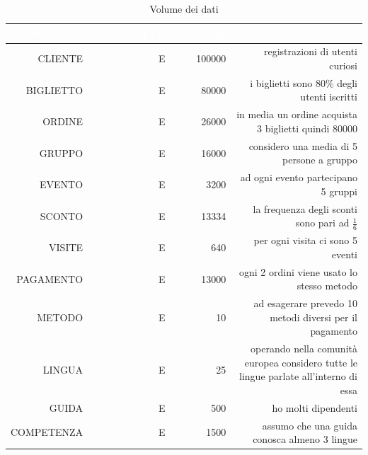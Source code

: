 \documentclass[a4paper,12pt]{report}
\begin{document}
\begin{xltabular}{\textwidth}{|D|D|D|D|}
	\caption{Volume dei dati} \label{tab:volumeDati}\\
	\hline
	 \textcolor{white}{\uppercase{concetto}} & \textcolor{white}{\uppercase{costrutto}} & \textcolor{white}{\uppercase{volume}} & \textcolor{white}{\uppercase{descrizione}} \\
	\hline
	\endhead
	\uppercase{cliente}                 & \uppercase{e}         & 100000             & registrazioni di utenti curiosi                                                       \\
	\hline
	\uppercase{biglietto}               & \uppercase{e}         & 80000              & i biglietti sono 80\% degli utenti iscritti                                           \\
	\hline
	\uppercase{ordine}                  & \uppercase{e}         & 26000              & in media un ordine acquista 3 biglietti quindi 80000                                  \\
	\hline
	\uppercase{gruppo}                  & \uppercase{e}         & 16000              & considero una media di 5 persone a gruppo                                             \\
	\hline
	\uppercase{evento}                  & \uppercase{e}         & 3200               & ad ogni evento partecipano 5 gruppi                                                   \\
	\hline
	\uppercase{sconto}                  & \uppercase{e}         & 13334              & la frequenza degli sconti sono pari ad \(\frac16\)                                    \\
	\hline
	\uppercase{visite}                  & \uppercase{e}         & 640                & per ogni visita ci sono 5 eventi                                                      \\
	\hline
	\uppercase{pagamento}               & \uppercase{e}         & 13000              & ogni 2 ordini viene usato lo stesso metodo                                            \\
	\hline
	\uppercase{metodo}                  & \uppercase{e}         & 10                 & ad esagerare prevedo 10 metodi diversi per il pagamento                               \\
	\hline
	\uppercase{lingua}                  & \uppercase{e}         & 25                 & operando nella comunità europea considero tutte le lingue parlate all'interno di essa \\
	\hline
	\uppercase{guida}                  & \uppercase{e}         & 500                & ho molti dipendenti \\
	\hline
	\uppercase{competenza}             & \uppercase{e}         & 1500                & assumo che una guida conosca almeno 3 lingue \\
	\hline
\end{xltabular}
\end{document}

